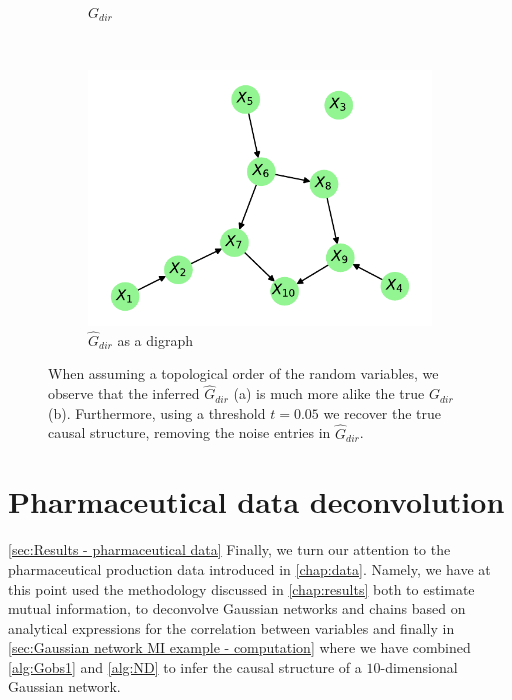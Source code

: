 \documentclass[../Thesis.tex]{subfiles}
\begin{document}
\begin{figure}[H]
\begin{subfigure}[t]{0.49\linewidth}
        \caption{$G_{dir}$}
    \end{subfigure}
    \\[\baselineskip]
    \begin{subfigure}[t]{0.49\linewidth}
        \includegraphics[width = \linewidth]{figures/ND examples/Gaussian network 10 - G_dir as graph - triangular.pdf}
        \caption{$\hat{G}_{dir}$ as a digraph}
    \end{subfigure}
    \caption{When assuming a topological order of the random variables, we observe that the inferred $\hat{G}_{dir}$ (a) is much more alike the true $G_{dir}$ (b). Furthermore, using a threshold $t = 0.05$ we recover the true causal structure, removing the noise entries in $\hat{G}_{dir}$.}
    \label{fig:estimated MI 10 Gaussian results - triangular}
\end{figure}




\newpage
\section{Pharmaceutical data deconvolution}\autoref{sec:Results - pharmaceutical data}
Finally, we turn our attention to the pharmaceutical production data introduced in \autoref{chap:data}. Namely, we have at this point used the methodology discussed in \autoref{chap:results} both to estimate mutual information, to deconvolve Gaussian networks and chains based on analytical expressions for the correlation between variables and finally in \autoref{sec:Gaussian network MI example - computation} where we have combined \autoref{alg:Gobs1} and \autoref{alg:ND} to infer the causal structure of a $10$-dimensional Gaussian network.
\end{document}
